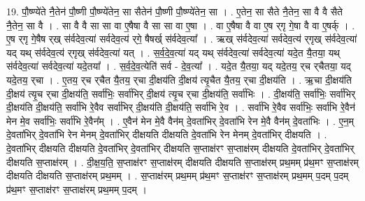 \documentclass[17pt]{extarticle}
\begin{document}
19. पौ॒ष्ण्ये॑ते नै॒तेन॑ पौ॒ष्णी पौ॒ष्ण्ये॑तेन॒ सा सैतेन॑ पौ॒ष्णी पौ॒ष्ण्ये॑तेन॒ सा । . ए॒तेन॒ सा सैते नै॒तेन॒ सा वै वै सैते नै॒तेन॒ सा वै । . सा वै वै सा सा वा ए॒षैषा वै सा सा वा ए॒षा । . वा ए॒षैषा वै वा ए॒ष र्‌गृ गे॒षा वै वा ए॒षर्क् । . ए॒ष र्‌गृ गे॒षैष र्‌ख् स॑र्वदेव॒त्या॑ सर्वदेव॒त्य॑ र्‌गे॒ षैषर्ख् स॑र्वदेव॒त्या᳚ । . ऋख् स॑र्वदेव॒त्या॑ सर्वदेव॒त्य॑ र्‌गृख् स॑र्वदेव॒त्या॑ यद् यथ् स॑र्वदेव॒त्य॑ र्‌गृख् स॑र्वदेव॒त्या॑ यत् । . स॒र्व॒दे॒व॒त्या॑ यद् यथ् स॑र्वदेव॒त्या॑ सर्वदेव॒त्या॑ यदे॒त यै॒तया॒ यथ् स॑र्वदेव॒त्या॑ सर्वदेव॒त्या॑ यदे॒तया᳚ । . स॒र्व॒दे॒व॒त्येति॑ सर्व - दे॒व॒त्या᳚ । . यदे॒त यै॒तया॒ यद् यदे॒तय॒ र्‌च र्‌चैतया॒ यद् यदे॒तय॒ र्‌चा । . ए॒तय॒ र्‌च र्‌चैत यै॒तय॒ र्‌चा दी॒क्षय॑ति दी॒क्षय॑ त्यृ॒चैत यै॒तय॒ र्‌चा दी॒क्षय॑ति । . ऋ॒चा दी॒क्षय॑ति दी॒क्षय॑ त्यृ॒च र्‌चा दी॒क्षय॑ति॒ सर्वा॑भिः॒ सर्वा॑भिर् दी॒क्षय॑ त्यृ॒च र्‌चा दी॒क्षय॑ति॒ सर्वा॑भिः । . दी॒क्षय॑ति॒ सर्वा॑भिः॒ सर्वा॑भिर् दी॒क्षय॑ति दी॒क्षय॑ति॒ सर्वा॑भि रे॒वैव सर्वा॑भिर् दी॒क्षय॑ति दी॒क्षय॑ति॒ सर्वा॑भि रे॒व । . सर्वा॑भि रे॒वैव सर्वा॑भिः॒ सर्वा॑भि रे॒वैन॑ मेन मे॒व सर्वा॑भिः॒ सर्वा॑भि रे॒वैन᳚म् । . ए॒वैन॑ मेन मे॒वै वैन॑म् दे॒वता॑भिर् दे॒वता॑भि रेन मे॒वै वैन॑म् दे॒वता॑भिः । . ए॒न॒म् दे॒वता॑भिर् दे॒वता॑भि रेन मेनम् दे॒वता॑भिर् दीक्षयति दीक्षयति दे॒वता॑भि रेन मेनम् दे॒वता॑भिर् दीक्षयति । . दे॒वता॑भिर् दीक्षयति दीक्षयति दे॒वता॑भिर् दे॒वता॑भिर् दीक्षयति स॒प्ताक्ष॑रꣳ स॒प्ताक्ष॑रम् दीक्षयति दे॒वता॑भिर् दे॒वता॑भिर् दीक्षयति स॒प्ताक्ष॑रम् । . दी॒क्ष॒य॒ति॒ स॒प्ताक्ष॑रꣳ स॒प्ताक्ष॑रम् दीक्षयति दीक्षयति स॒प्ताक्ष॑रम् प्रथ॒मम् प्र॑थ॒मꣳ स॒प्ताक्ष॑रम् दीक्षयति दीक्षयति स॒प्ताक्ष॑रम् प्रथ॒मम् । . स॒प्ताक्ष॑रम् प्रथ॒मम् प्र॑थ॒मꣳ स॒प्ताक्ष॑रꣳ स॒प्ताक्ष॑रम् प्रथ॒मम् प॒दम् प॒दम् प्र॑थ॒मꣳ स॒प्ताक्ष॑रꣳ स॒प्ताक्ष॑रम् प्रथ॒मम् प॒दम् । \newline
\end{document}
